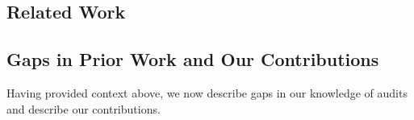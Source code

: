 \subsection{Related Work}
\label{sec:related}




\subsection{Gaps in Prior Work and Our Contributions}
Having provided context above, we now describe gaps in our knowledge of audits and describe our contributions. 
